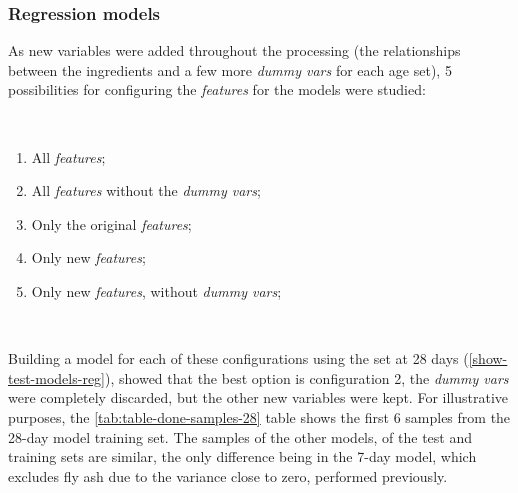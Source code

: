\documentclass[
]{article}
\providecommand{\tightlist}{%
  \setlength{\itemsep}{0pt}\setlength{\parskip}{0pt}}
\begin{document}
\hypertarget{regression-models}{%
\subsubsection{Regression models}\label{regression-models}}

As new variables were added throughout the processing (the relationships
between the ingredients and a few more \emph{dummy vars} for each age
set), 5 possibilities for configuring the \emph{features} for the models
were studied:

~

\begin{enumerate}
\def\labelenumi{\arabic{enumi}.}
\tightlist
\item
  All \emph{features};
\item
  All \emph{features} without the \emph{dummy vars};
\item
  Only the original \emph{features};
\item
  Only new \emph{features};
\item
  Only new \emph{features}, without \emph{dummy vars};
\end{enumerate}

~

Building a model for each of these configurations using the set at 28
days (\ref{show-test-models-reg}), showed that the best option is
configuration 2, the \emph{dummy vars} were completely discarded, but
the other new variables were kept. For illustrative purposes, the
\ref{tab:table-done-samples-28} table shows the first 6 samples from the
28-day model training set. The samples of the other models, of the test
and training sets are similar, the only difference being in the 7-day
model, which excludes fly ash due to the variance close to zero,
performed previously.
\end{document}
